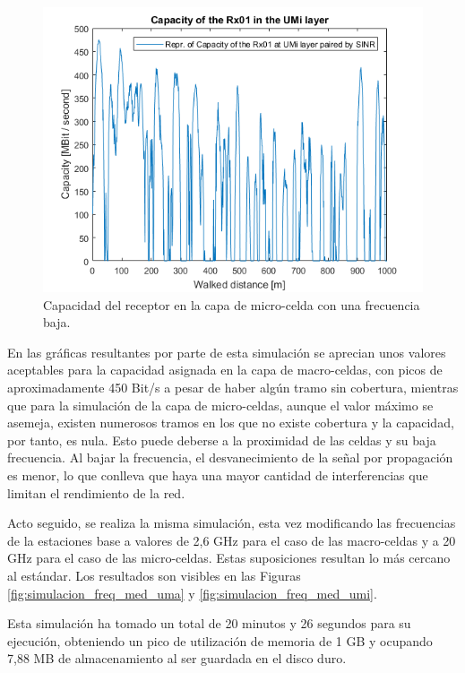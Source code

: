 \begin{figure}[h!]
	\centering
    \includegraphics[width=0.8\linewidth]{imagenes/6_3_capacidad_umi_minimo.png}
	\caption{Capacidad del receptor en la capa de micro-celda con una frecuencia baja.}
	\label{fig:simulacion_freq_min_umi}
\end{figure}

En las gráficas resultantes por parte de esta simulación se aprecian unos valores aceptables para la capacidad asignada en la capa de macro-celdas, con picos de aproximadamente 450 Bit/s a pesar de haber algún tramo sin cobertura, mientras que para la simulación de la capa de micro-celdas, aunque el valor máximo se asemeja, existen numerosos tramos en los que no existe cobertura y la capacidad, por tanto, es nula. Esto puede deberse a la proximidad de las celdas y su baja frecuencia. Al bajar la frecuencia, el desvanecimiento de la señal por propagación es menor, lo que conlleva que haya una mayor cantidad de interferencias que limitan el rendimiento de la red.

Acto seguido, se realiza la misma simulación, esta vez modificando las frecuencias de la estaciones base a valores de 2,6 GHz para el caso de las macro-celdas y a 20 GHz para el caso de las micro-celdas. Estas suposiciones resultan lo más cercano al estándar. Los resultados son visibles en las Figuras \ref{fig:simulacion_freq_med_uma} y \ref{fig:simulacion_freq_med_umi}.

Esta simulación ha tomado un total de 20 minutos y 26 segundos para su ejecución, obteniendo un pico de utilización de memoria de 1 GB y ocupando 7,88 MB de almacenamiento al ser guardada en el disco duro.

